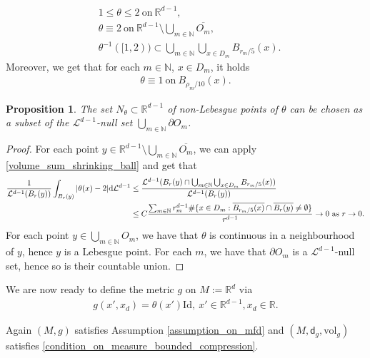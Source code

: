 \documentclass[a4paper,10pt]{article}
\newtheorem{proposition}[theorem]{Proposition}
\numberwithin{equation}{section}
\newcommand{\R}{\mathbb{R}}
\newcommand{\N}{\mathbb{N}}
\newcommand{\vol}{\mathrm{vol}}
\newcommand{\sfd}{\mathsf d}
\newcommand{\di}{{\rm d}}
\begin{document}
\begin{align}
    &1 \leq \theta \leq 2 \ \mathrm{on} \ \R^{d-1},\\
    &\theta \equiv 2 \ \mathrm{on} \ \R^{d-1}\setminus \bigcup_{m \in \N} \overline{O_m}, \\
    & \theta^{-1}([1,2)) \subset \bigcup_{m \in \N} \bigcup_{x \in D_m} B_{r_m/5}(x).
\end{align}
Moreover, we get that for each $m \in \N$, $x\in D_m$, it holds 
\begin{align}
    \theta \equiv 1 \ \mathrm{on}\ B_{\rho_m/10}(x).
\end{align}
\begin{proposition}\label{lebesgue_pts_theta}
    The set $N_\theta \subset \R^{d-1}$ of non-Lebesgue points of $\theta$ can be chosen as a subset of the $\mathcal{L}^{d-1}$-null set $\bigcup_{m \in \N} \partial O_m$.
\end{proposition}
\begin{proof}
    For each point $y\in \R^{d-1} \setminus \bigcup_{m \in \N} \overline{O_m}$, we can apply \eqref{volume_sum_shrinking_ball} and get that 
    \begin{align*}
        \frac{1}{\mathcal{L}^{d-1}(B_r(y))}\int_{B_r(y)} |\theta(x)-2| \di \mathcal{L}^{d-1} &\leq  \frac{\mathcal{L}^{d-1}(B_r(y) \cap \bigcup_{m\in \N} \bigcup_{x \in D_m} B_{r_m/5}(x))}{\mathcal{L}^{d-1}(B_r(y))} \\
        & \leq C \frac{\sum_{m \in \N}r^{d-1}_m\#\{x \in D_m: \overline{B_{r_m/5}(x)} \cap \overline{B_r(y)}\neq \emptyset\}}{r^{d-1}} \to 0\ \mathrm{as}\ r \to 0.
    \end{align*}
    For each point $y \in \bigcup_{m \in \N} O_m$, we have that $\theta$ is continuous in a neighbourhood of $y$, hence $y$ is a Lebesgue point. For each $m$, we have that $\partial O_m$ is a $\mathcal{L}^{d-1}$-null set, hence so is their countable union. 
\end{proof}

We are now ready to define the metric $g$ on $M:= \R^{d}$ via
\begin{align}
    g(x', x_d) = \theta(x') \mathrm{Id},\ x' \in \R^{d-1}, x_d \in \R. 
\end{align}

Again $(M, g)$ satisfies Assumption \ref{assumption_on_mfd} and $(M, \sfd_g, \vol_g)$ satisfies \eqref{condition_on_measure_bounded_compression}.  
\end{document}
